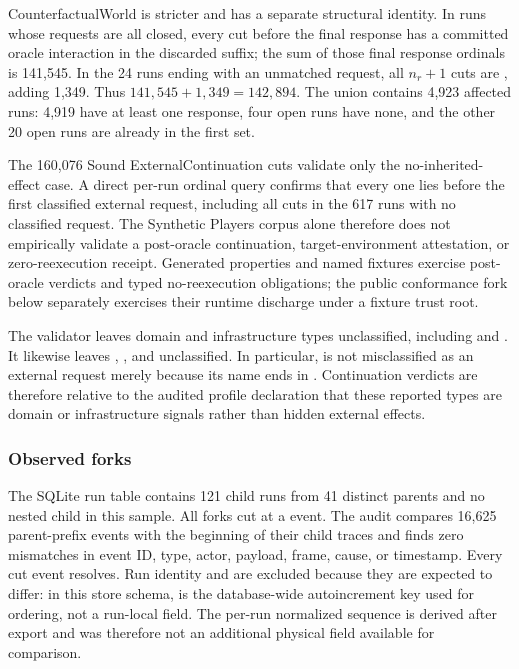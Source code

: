 CounterfactualWorld is stricter and has a separate structural identity.  In
runs whose requests are all closed, every cut before the final response has a
committed oracle interaction in the discarded suffix; the sum of those final
response ordinals is 141,545.  In the 24 runs ending with an unmatched request,
all $n_r+1$ cuts are , adding 1,349.  Thus
$141{,}545+1{,}349=142{,}894$.  The union contains 4,923 affected runs: 4,919
have at least one response, four open runs have none, and the other 20 open runs
are already in the first set.

The 160,076 Sound ExternalContinuation cuts validate only the
no-inherited-effect case.  A direct per-run ordinal query confirms that every
one lies before the first classified external request, including all cuts in
the 617 runs with no classified request.  The Synthetic Players corpus alone
therefore does not empirically validate a post-oracle continuation,
target-environment attestation, or zero-reexecution receipt.  Generated
properties and named fixtures exercise post-oracle verdicts and typed
no-reexecution obligations; the public conformance fork below separately
exercises their runtime discharge under a fixture trust root.

The validator leaves domain and infrastructure types unclassified, including
 and .  It likewise leaves
, , and  unclassified.  In particular,
 is not misclassified as an external request merely
because its name ends in .  Continuation verdicts are therefore
relative to the audited profile declaration that these reported types are
domain or infrastructure signals rather than hidden external effects.

\subsubsection{Observed forks}

The SQLite run table contains 121 child runs from 41 distinct parents and no
nested child in this sample.  All forks cut at a  event.  The
audit compares 16,625 parent-prefix events with the beginning of their child
traces and finds zero mismatches in event ID, type, actor, payload, frame, cause,
or timestamp.  Every cut event resolves.  Run identity and 
are excluded because they are expected to differ: in this store schema,
 is the database-wide autoincrement key used for ordering, not a
run-local field.  The per-run normalized sequence is derived after export and
was therefore not an additional physical field available for comparison.

